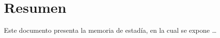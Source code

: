 \section{Resumen}
Este documento presenta la memoria de estadía, en la cual se expone \dots

\newpage